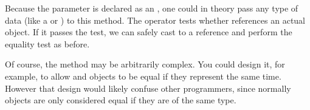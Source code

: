 Because the parameter is declared as an , one could in theory pass any type of data (like a  or ) to this method.
The  operator tests whether  references an actual  object.
If it passes the test, we can safely cast  to a  reference and perform the equality test as before.

Of course, the  method may be arbitrarily complex.
You could design it, for example, to allow  and  objects to be equal if they represent the same time.
However that design would likely confuse other programmers, since normally objects are only considered equal if they are of the same type.
